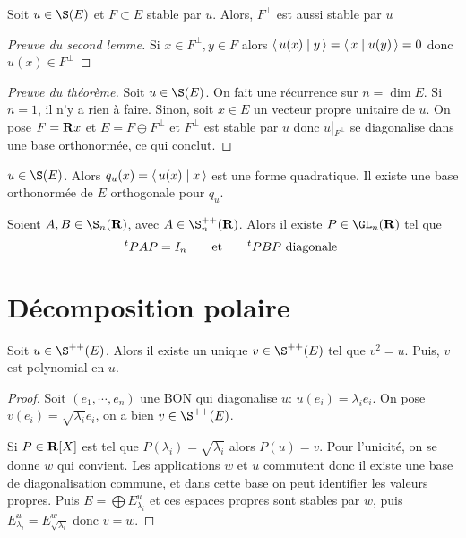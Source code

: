 \begin{lmm}
    Soit $u \in  \S(E)$ et $F\subset E$ stable par  $u$. Alors,  $F^\bot$ est aussi stable par  $u$
\end{lmm}

\begin{proof}[Preuve du second lemme]
    Si $x \in  F^\bot, y \in  F$ alors $ \scalar{u(x)}{y}= \scalar{x}{u(y)}=0  $ donc $u(x)\in F^\bot$
\end{proof}

\begin{proof}[Preuve du théorème]
    Soit $u \in  \S(E)$. On fait une récurrence sur $n=\dim E$. Si  $n=1$, il n'y a rien à faire. Sinon, soit  $x\in  E$ un vecteur propre unitaire de $u$. On pose $F=\mathbf R x$ et $E=F\oplus F^\bot$ et  $F^\bot$ est stable par  $u$ donc  $u\left|_{F^\bot}\right.$ se diagonalise dans une base orthonormée, ce qui conclut.
\end{proof}


\begin{cor}
    $u \in  \S(E)$. Alors $q_u(x)= \scalar{u(x)}{x} $ est une forme quadratique. Il existe une base orthonormée de $E$ orthogonale pour $q_u$.
\end{cor}

\begin{cor}
    Soient $A, B \in  \S_n(\R)$, avec $A \in  \S_n^{++}(\R)$. Alors il existe $P \in  \GL_n(\R)$ tel que \[
        {}^t PAP=I_n \qquad \text{et}\qquad  {}^t PBP\text{ diagonale }
    \]
\end{cor}


\section{Décomposition polaire}

\begin{prop}
    Soit $u \in  \S^{++}(E)$. Alors il existe un unique $v \in  \S ^{++}(E)$ tel que $v^2 =u$. Puis, $v$ est polynomial en  $u$.
\end{prop}

\begin{proof}
    Soit $(e_1, \cdots , e_n)$ une BON qui diagonalise $u$:  $ u(e_i)=\lambda_i e_i$. On pose $v(e_i)=\sqrt{\lambda_i}e_i$, on a bien  $v \in  \S ^{++}(E)$.

    Si $P \in  \mathbf R[X]$ est tel que $P(\lambda_i)=\sqrt{\lambda_i}$ alors  $P(u)=v$. Pour l'unicité, on se donne  $w$ qui convient. Les applications  $w$ et  $u$ commutent donc il existe une base de diagonalisation commune, et dans cette base on peut identifier les valeurs propres. Puis  $E=\bigoplus E_{\lambda_i}^u$ et  ces espaces propres sont stables par  $w$, puis  $E_{\lambda_i}^u=E_{\sqrt{\lambda_i}}^w$ donc  $v=w$.
\end{proof}

